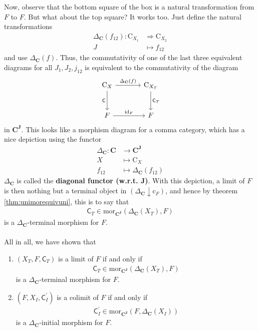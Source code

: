 Now, observe that the bottom square of the box is a natural transformation from $F$ to $F$.
But what about the top square?
It works too.
Just define the natural transformations
\begin{align*}
  \Delta_{\mathbf{C}}(f_{12})
  \colon
  \mathrm{C}_{X_{1}}
  &\Rightarrow
  \mathrm{C}_{X_{2}}
  \\
  J
  &\mapsto
  f_{12}
\end{align*}
and use $\Delta_{\mathbf{C}}(f)$.
Thus, the commutativity of one of the last three equivalent diagrams for all $J_{1},J_{2},j_{12}$ is equivalent to the commutativity of the diagram
\[
\begin{tikzcd}[sep=large]
  \mathrm{C}_{X}
  \arrow{r}{\Delta_{\mathbf{C}}(f)}
  \arrow[swap]{d}{\mathsf{C}}
  &
  \mathrm{C}_{X_{T}}
  \arrow{d}{\mathsf{C}_{T}}
  \\
  F
  \arrow{r}{\mathrm{id}_{F}}
  &
  F
\end{tikzcd}
\]
in $\mathbf{C}^{\mathbf{J}}$.
This looks like a morphism diagram for a comma category, which has a nice depiction using the functor
\begin{align*}
  \Delta_{\mathbf{C}}
  \colon
  \mathbf{C}
  &\rightarrow
  \mathbf{C}^{\mathbf{J}}
  \\
  X
  &\mapsto
  \mathrm{C}_{X}
  \\
  f_{12}
  &\mapsto
  \Delta_{\mathbf{C}}(f_{12})
\end{align*}
$\Delta_{\mathbf{C}}$ is called the \textbf{diagonal functor (w.r.t. $\mathbf{J}$)}.
With this depiction, a limit of $F$ is then nothing but a terminal object in $(\Delta_{\mathbf{C}} \downarrow \mathrm{c}_{F})$, and hence by theorem \ref{thm:unimorequivuni}, this is to say that
\begin{align*}
  \mathsf{C}_{T}
  \in
  \mathrm{mor}_{\mathbf{C}^{\mathbf{J}}}(\Delta_{\mathbf{C}}(X_{T}),F)
\end{align*}
is a $\Delta_{\mathbf{C}}$-terminal morphism for $F$.
\\\\
All in all, we have shown that
\\
\begin{thm}
\label{thm:limitequiv}
\begin{enumerate}
\item[(1T)]
$(X_{T},F,\mathsf{C}_{T})$ is a limit of $F$ if and only if
\begin{align*}
  \mathsf{C}_{T}
  \in
  \mathrm{mor}_{\mathbf{C}^{\mathbf{J}}}(\Delta_{\mathbf{C}}(X_{T}),F)
\end{align*}
is a $\Delta_{\mathbf{C}}$-terminal morphism for $F$.
\item[(1I)]
$(F,X_{I},\mathsf{C}_{I}^{\prime})$ is a colimit of $F$ if and only if
\begin{align*}
  \mathsf{C}_{I}^{\prime}
  \in
  \mathrm{mor}_{\mathbf{C}^{\mathbf{J}}}(F,\Delta_{\mathbf{C}}(X_{I}))
\end{align*}
is a $\Delta_{\mathbf{C}}$-initial morphism for $F$.
\end{enumerate}
\end{thm}
